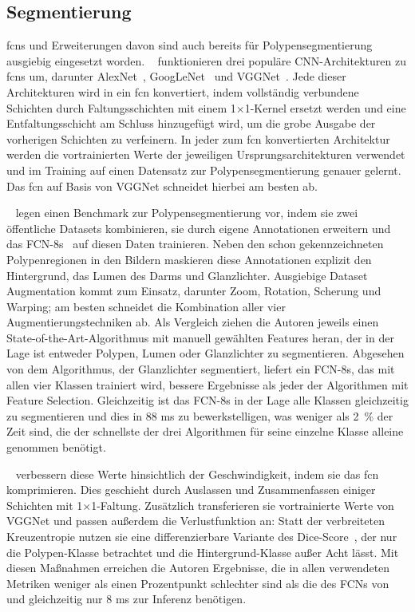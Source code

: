 \subsection{Segmentierung}

\glspl{fcn} und Erweiterungen davon sind auch bereits für Polypensegmentierung ausgiebig eingesetzt worden.
\citeauthor{Brandao.2017}~\cite{Brandao.2017} funktionieren drei populäre CNN-Architekturen zu \glspl{fcn} um, darunter AlexNet~\cite{Krizhevsky.2012}, GoogLeNet~\cite{Szegedy.2015} und VGGNet~\cite{Simonyan.2014}.
Jede dieser Architekturen wird in ein \gls{fcn} konvertiert, indem vollständig verbundene Schichten durch Faltungsschichten mit einem 1$\times$1-Kernel ersetzt werden und eine Entfaltungsschicht am Schluss hinzugefügt wird, um die grobe Ausgabe der vorherigen Schichten zu verfeinern.
In jeder zum \gls{fcn} konvertierten Architektur werden die vortrainierten Werte der jeweiligen Ursprungsarchitekturen verwendet und im Training auf einen Datensatz zur Polypensegmentierung genauer gelernt.
Das \gls{fcn} auf Basis von VGGNet schneidet hierbei am besten ab.

\citeauthor{Vazquez.2017}~\cite{Vazquez.2017} legen einen Benchmark zur Polypensegmentierung vor, indem sie zwei öffentliche Datasets kombinieren, sie durch eigene Annotationen erweitern und das FCN-8s~\cite{Long.2015} auf diesen Daten trainieren.
Neben den schon gekennzeichneten Polypenregionen in den Bildern maskieren diese Annotationen explizit den Hintergrund, das Lumen des Darms und Glanzlichter.
Ausgiebige Dataset Augmentation kommt zum Einsatz, darunter Zoom, Rotation, Scherung und Warping; am besten schneidet die Kombination aller vier Augmentierungstechniken ab.
Als Vergleich ziehen die Autoren jeweils einen State-of-the-Art-Algorithmus mit manuell gewählten Features heran, der in der Lage ist entweder Polypen, Lumen oder Glanzlichter zu segmentieren.
Abgesehen von dem Algorithmus, der Glanzlichter segmentiert, liefert ein FCN-8s, das mit allen vier Klassen trainiert wird, bessere Ergebnisse als jeder der Algorithmen mit Feature Selection.
Gleichzeitig ist das FCN-8s in der Lage alle Klassen gleichzeitig zu segmentieren und dies in 88 ms zu bewerkstelligen, was weniger als 2~\% der Zeit sind, die der schnellste der drei Algorithmen für seine einzelne Klasse alleine genommen benötigt.

\citeauthor{Wichakam.2018}~\cite{Wichakam.2018} verbessern diese Werte hinsichtlich der Geschwindigkeit, indem sie das \gls{fcn} komprimieren.
Dies geschieht durch Auslassen und Zusammenfassen einiger Schichten mit 1$\times$1-Faltung.
Zusätzlich transferieren sie vortrainierte Werte von VGGNet und passen außerdem die Verlustfunktion an:
Statt der verbreiteten Kreuzentropie nutzen sie eine differenzierbare Variante des Dice-Score~\cite{Srensen.1948}, der nur die Polypen-Klasse betrachtet und die Hintergrund-Klasse außer Acht lässt.
Mit diesen Maßnahmen erreichen die Autoren Ergebnisse, die in allen verwendeten Metriken weniger als einen Prozentpunkt schlechter sind als die des FCNs von \citeauthor{Vazquez.2017} und gleichzeitig nur 8 ms zur Inferenz benötigen.

